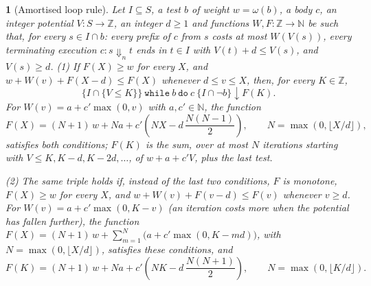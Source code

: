 \documentclass[oneside,english]{amsart}
\numberwithin{equation}{section}
\numberwithin{figure}{section}
\theoremstyle{plain}
\theoremstyle{definition}
\theoremstyle{plain}
\newtheorem{prop}[thm]{\protect\propositionname}
\theoremstyle{remark}
\theoremstyle{plain}
\theoremstyle{definition}
\theoremstyle{plain}
\theoremstyle{remark}
\providecommand{\propositionname}{Proposition}
\begin{document}
\begin{prop}[Amortised loop rule]
\label{prop:amortised-loop}
Let $I \subseteq S$, a test $b$ of weight $w = \omega(b)$, a body $c$, an integer potential $V : S \to \mathbb{Z}$, an integer $d \ge 1$ and functions $W, F : \mathbb{Z} \to \mathbb{N}$ be such that, for every $s \in I \cap b$: every prefix of $c$ from $s$ costs at most $W(V(s))$, every terminating execution $c : s \Downarrow_n t$ ends in $t \in I$ with $V(t) + d \le V(s)$, and $V(s) \ge d$. (1) If $F(X) \ge w$ for every $X$, and $w + W(v) + F(X - d) \le F(X)$ whenever $d \le v \le X$, then, for every $K \in \mathbb{Z}$,
\[
\{I \cap \{V \le K\}\}\ \mathtt{while}\ b\ \mathtt{do}\ c\ \{I \cap \neg b\}\!\downarrow\! F(K).
\]
For $W(v) = a + c' \max(0, v)$ with $a, c' \in \mathbb{N}$, the function
\[
F(X) = (N + 1)\,w + N a + c' \left(N X - d\,\frac{N (N - 1)}{2}\right), \qquad N = \max(0, \lfloor X / d \rfloor),
\]
satisfies both conditions; $F(K)$ is the sum, over at most $N$ iterations starting with $V \le K, K - d, K - 2d, \dots$, of $w + a + c' V$, plus the last test.

(2) The same triple holds if, instead of the last two conditions, $F$ is monotone, $F(X) \ge w$ for every $X$, and $w + W(v) + F(v - d) \le F(v)$ whenever $v \ge d$. For $W(v) = a + c' \max(0, K - v)$ (an iteration costs more when the potential has fallen further), the function $F(X) = (N + 1)\,w + \sum_{m=1}^{N} \big(a + c' \max(0, K - m d)\big)$, with $N = \max(0, \lfloor X / d \rfloor)$, satisfies these conditions, and
\[
F(K) = (N + 1)\,w + N a + c' \left(N K - d\,\frac{N (N + 1)}{2}\right), \qquad N = \max(0, \lfloor K / d \rfloor).
\]
\end{prop}
\end{document}
